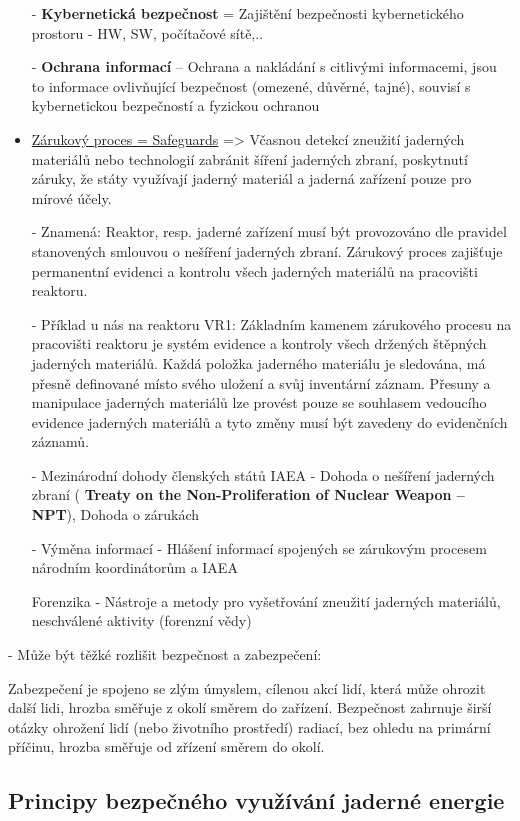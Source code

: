 \begin{itemize}
    \noindent - \textbf{Kybernetická bezpečnost} = Zajištění bezpečnosti kybernetického prostoru - HW, SW, počítačové sítě,..

    \noindent - \textbf{Ochrana informací} -- Ochrana a nakládání s citlivými informacemi, jsou to informace ovlivňující bezpečnost (omezené, důvěrné, tajné), souvisí s kybernetickou bezpečností a fyzickou ochranou
    
    \item \underline{Zárukový proces = Safeguards} => Včasnou detekcí zneužití jaderných materiálů nebo technologií zabránit šíření jaderných zbraní, poskytnutí záruky, že státy využívají jaderný materiál a jaderná zařízení pouze pro mírové účely.

    - Znamená: Reaktor, resp. jaderné zařízení musí být provozováno dle pravidel stanovených smlouvou o nešíření jaderných zbraní. Zárukový proces zajišťuje permanentní evidenci a kontrolu všech jaderných materiálů na pracovišti reaktoru.

    - Příklad u nás na reaktoru VR1: Základním kamenem zárukového procesu na pracovišti reaktoru je systém evidence a kontroly všech držených štěpných jaderných materiálů. Každá položka jaderného materiálu je sledována, má přesně definované místo svého uložení a svůj inventární záznam. Přesuny a manipulace jaderných materiálů lze provést pouze se souhlasem vedoucího evidence jaderných materiálů a tyto změny musí být zavedeny do evidenčních záznamů.

   - Mezinárodní dohody členských států IAEA - Dohoda o nešíření jaderných zbraní ( \textbf{Treaty on the Non-Proliferation of Nuclear Weapon -- NPT}), Dohoda o zárukách
       
        - Výměna informací - Hlášení informací spojených se zárukovým procesem národním koordinátorům a IAEA

    Forenzika - Nástroje a metody pro vyšetřování zneužití jaderných materiálů, neschválené aktivity (forenzní vědy)
    
\end{itemize}

- Může být těžké rozlišit bezpečnost a zabezpečení:

Zabezpečení je spojeno se zlým úmyslem, cílenou akcí lidí, která může ohrozit další lidi, hrozba směřuje z okolí směrem do zařízení. Bezpečnost zahrnuje širší otázky ohrožení lidí (nebo životního prostředí) radiací, bez ohledu na primární příčinu, hrozba směřuje od zřízení směrem do okolí.


\subsection{Principy bezpečného využívání jaderné energie}

